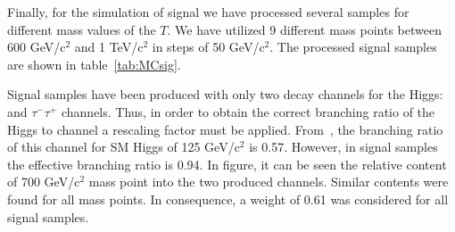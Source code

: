 Finally, for the simulation of signal we have processed several samples for different mass values of the $T$. We have utilized 9 different mass points between 600 GeV/$\text{c}^{2}$ and 1 TeV/$\text{c}^{2}$ in steps of 50 GeV/$\text{c}^{2}$. The processed signal samples are shown in table~\ref{tab:MCsig}.

\begin{table}[htbH]
\begin{center}
\caption{List of Monte-Carlo background signal used in the analysis, their corresponding cross-section and mass of the $T$.\label{tab:MCsig}}
\end{center}
\end{table}

Signal samples have been produced with only two decay channels for the Higgs: \bbbar and $\tau^{-}\tau^{+}$ channels. Thus, in order to obtain the correct branching ratio of the Higgs to \bbbar channel a rescaling factor must be applied. From~\cite{Heinemeyer:2013tqa}, the branching ratio of this channel for SM Higgs of 125 GeV/$\text{c}^{2}$ is 0.57. However, in signal samples the effective branching ratio is 0.94. In figure, it can be seen the relative content of 700 GeV/$\text{c}^{2}$ mass point into the two produced channels. Similar contents were found for all mass points. In consequence, a weight of 0.61 was considered for all signal samples.

